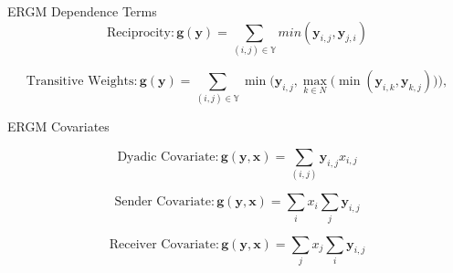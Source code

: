 \documentclass{beamer}
\begin{document}
\begin{frame}{ERGM Dependence Terms}
$$ \text{Reciprocity}: \bm{g(y)} = \sum_{(i,j) {\in} \mathbb{Y}}min(\bm{y}_{i,j},\bm{y}_{j,i})$$

$$\text{Transitive Weights}: \bm{g(y)} =  \sum_{(i,j) {\in} \mathbb{Y}}\min\bigg( \bm{y}_{i,j}, \max\limits_{k{\in}N}\Big(\min(\bm{y}_{i,k},\bm{y}_{k,j})\Big) \bigg),$$ 


\end{frame}

\begin{frame}{ERGM Covariates}

$$ \text{Dyadic Covariate}: \bm{g(y,x)} = \sum_{(i,j)} \bm{y}_{i,j}x_{i,j}$$ 

$$ \text{Sender Covariate}: \bm{g(y,x)} = \sum_{i}x_i \sum_{j} \bm{y}_{i,j}$$

$$ \text{Receiver Covariate}: \bm{g(y,x)} = \sum_{j}x_j \sum_{i} \bm{y}_{i,j}$$

\end{frame}
\end{document}
